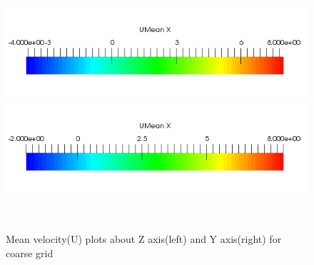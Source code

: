 \begin{figure}[H]
\begin{minipage}[b]{0.5\linewidth}
\caption*{}
\end{minipage}\\
\begin{minipage}[b]{0.5\linewidth}
\includegraphics[scale=0.35]{figure/z_scale.png}
\end{minipage}
\begin{minipage}[b]{0.5\linewidth}
\includegraphics[scale=0.35]{figure/y_scale.png}
\end{minipage}\\

\caption{Mean velocity(U) plots about Z axis(left) and Y axis(right) for coarse grid}
\label{fig:42}
\end{figure}
\hspace{0.25cm}





